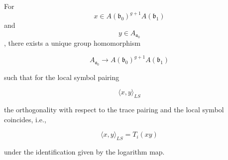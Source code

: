 For $$x \in A(\mathfrak{b}_0)^{g+1} A(\mathfrak{b}_1)$$ and $$y \in A_{\mathfrak{a}_0}$$, there exists a unique group homomorphism

$$A_{\mathfrak{a}_0} \to A(\mathfrak{b}_0)^{g+1} A(\mathfrak{b}_1)$$

such that for the local symbol pairing

$$\langle x, y \rangle_{LS}$$

the orthogonality with respect to the trace pairing and the local symbol coincides, i.e.,

$$\langle x, y \rangle_{LS} = T_i(xy)$$

under the identification given by the logarithm map.
